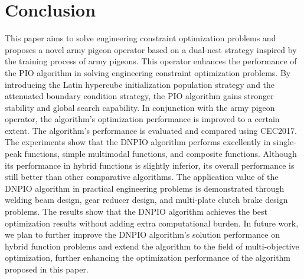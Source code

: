 \documentclass[preprint,review,compress,12pt]{elsarticle}
\begin{document}
\section{Conclusion}
This paper aims to solve engineering constraint optimization problems and proposes a novel army pigeon operator based on a dual-nest strategy inspired by the training process of army pigeons. This operator enhances the performance of the PIO algorithm in solving engineering constraint optimization problems. By introducing the Latin hypercube initialization population strategy and the attenuated boundary condition strategy, the PIO algorithm gains stronger stability and global search capability. In conjunction with the army pigeon operator, the algorithm's optimization performance is improved to a certain extent. The algorithm's performance is evaluated and compared using CEC2017. The experiments show that the DNPIO algorithm performs excellently in single-peak functions, simple multimodal functions, and composite functions. Although its performance in hybrid functions is slightly inferior, its overall performance is still better than other comparative algorithms. The application value of the DNPIO algorithm in practical engineering problems is demonstrated through welding beam design, gear reducer design, and multi-plate clutch brake design problems. The results show that the DNPIO algorithm achieves the best optimization results without adding extra computational burden. In future work, we plan to further improve the DNPIO algorithm's solution performance on hybrid function problems and extend the algorithm to the field of multi-objective optimization, further enhancing the optimization performance of the algorithm proposed in this paper.


 




\end{document}

